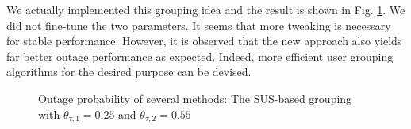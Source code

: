 \documentclass[11pt, draft, onecolumn ]{IEEEtran}
\def\scalefig#1{\epsfxsize #1\textwidth}
\begin{document}
{We actually implemented  this grouping idea and the result is shown in Fig.  \ref{fig:grouping_Reviewer1_3}. We did not fine-tune the two parameters. It seems that more tweaking is necessary for stable performance. However, it is observed that the new approach also yields far better outage performance as expected. Indeed, more efficient user grouping algorithms for the desired purpose can be devised.}

\begin{figure}[ht]
\begin{psfrags}
    \centerline{ \scalefig{0.6}  }
    \caption{{Outage probability of several methods:  The SUS-based grouping with $\theta_{\tau,1}=0.25$ and $\theta_{\tau,2}=0.55$}}
    \label{fig:grouping_Reviewer1_3}
\end{psfrags}
\end{figure}












\end{document}
